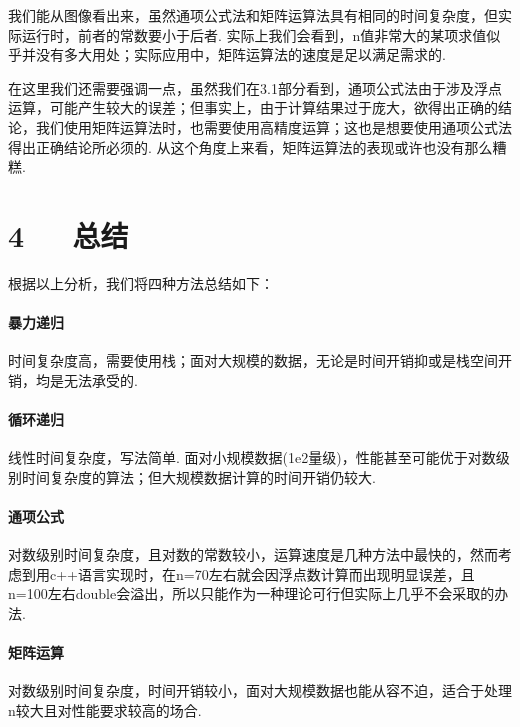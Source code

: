 \documentclass[UTF8]{ctexart}
\begin{document}
我们能从图像看出来，虽然通项公式法和矩阵运算法具有相同的时间复杂度，但实际运行时，前者的常数要小于后者. 实际上我们会看到，n值非常大的某项求值似乎并没有多大用处；实际应用中，矩阵运算法的速度是足以满足需求的.\par
在这里我们还需要强调一点，虽然我们在3.1部分看到，通项公式法由于涉及浮点运算，可能产生较大的误差；但事实上，由于计算结果过于庞大，欲得出正确的结论，我们使用矩阵运算法时，也需要使用高精度运算；这也是想要使用通项公式法得出正确结论所必须的. 从这个角度上来看，矩阵运算法的表现或许也没有那么糟糕.

\section*{4\ \ \ 总结}
根据以上分析，我们将四种方法总结如下：
\paragraph{暴力递归} 时间复杂度高，需要使用栈；面对大规模的数据，无论是时间开销抑或是栈空间开销，均是无法承受的.
\paragraph{循环递归} 线性时间复杂度，写法简单. 面对小规模数据(1e2量级)，性能甚至可能优于对数级别时间复杂度的算法；但大规模数据计算的时间开销仍较大.
\paragraph{通项公式} 对数级别时间复杂度，且对数的常数较小，运算速度是几种方法中最快的，然而考虑到用c++语言实现时，在n=70左右就会因浮点数计算而出现明显误差，且n=100左右double会溢出，所以只能作为一种理论可行但实际上几乎不会采取的办法.
\paragraph{矩阵运算} 对数级别时间复杂度，时间开销较小，面对大规模数据也能从容不迫，适合于处理n较大且对性能要求较高的场合.
\end{document}
